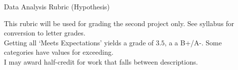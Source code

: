 \documentclass{article}
\begin{document}
{\LARGE Data Analysis Rubric (Hypothesis)}

\vspace*{18pt}

\noindent
\hspace*{24pt} This rubric will be used for grading the second project only. See syllabus for conversion to letter grades. \\
\hspace*{24pt} Getting all `Meets Expectations' yields a grade of $3.5$, a
  a B+/A-. Some categories have values for exceeding. \\
\hspace*{24pt} I may award half-credit for
  work that falls between descriptions.



\vspace*{18pt}
\end{document}
